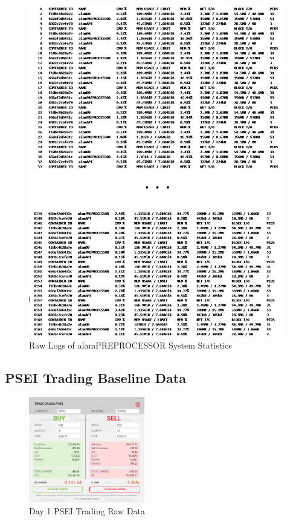 \begin{figure}[ht]
    \centering
    \includegraphics[height=0.80\textheight]{./assets/Appendices/B/RawTestsData/RawLogs/PREPROCStats.png}
    \caption{Raw Logs of alamPREPROCESSOR System Statistics}
    \label{fig:PreProcStats}
\end{figure}
\FloatBarrier

\subsection{PSEI Trading Baseline Data}
\label{subsec:baseline}

\begin{figure}[ht]
    \centering
    \includegraphics[width=0.45\textwidth]{./assets/Appendices/B/RawTestsData/PSEI_baseline/day1.png}
    \caption{Day 1 PSEI Trading Raw Data}
    \label{fig:PSEIday1}
\end{figure}
\FloatBarrier

